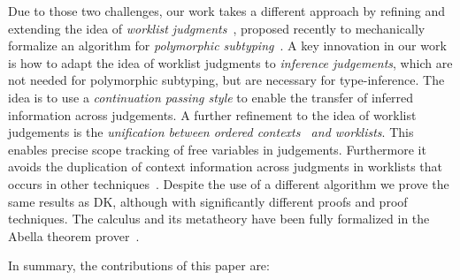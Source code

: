 Due to those two challenges, our work takes a different approach by refining and
extending the idea of \emph{worklist judgments}~\cite{itp2018},
proposed recently to mechanically formalize an algorithm for
\emph{polymorphic subtyping}~\cite{odersky1996putting}. A key innovation in our work is how
to adapt the idea of worklist judgments to
\emph{inference judgements}, which are not needed for polymorphic
subtyping, but are necessary for type-inference.  The idea is to use a \emph{continuation
passing style} to enable the transfer of inferred information across
judgements. A further refinement to the idea of worklist judgements is
the \emph{unification between ordered
  contexts~\cite{gundry2010type,dunfield2013complete} and worklists}.  This
enables precise scope tracking of free variables in
judgements. Furthermore it avoids the duplication of context
information across judgments in worklists that occurs in other
techniques~\cite{Reed2009,Abel2011higher}.
Despite the use of a different algorithm we prove the
same results as DK, although with significantly different proofs and
proof techniques. The calculus and its metatheory
have been fully formalized in the Abella theorem prover~\cite{AbellaDesc}.

In summary, the contributions of this paper are:

